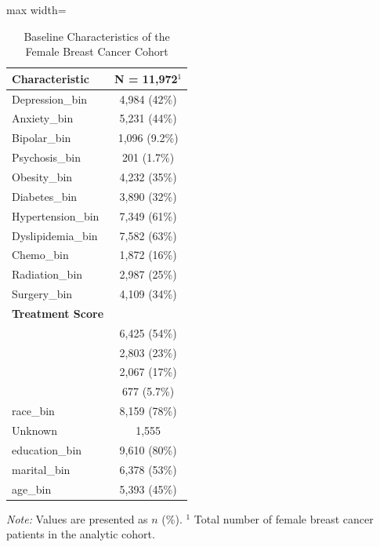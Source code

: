 \documentclass[11pt]{article}
\begin{document}
\begin{table}[H]
\centering
\caption{Baseline Characteristics of the Female Breast Cancer Cohort}
\label{tab:baseline_characteristics}
\small

\begin{adjustbox}{max width=\textwidth}
\begin{tabular}{lc}
\toprule
\textbf{Characteristic} & \textbf{N = 11,972$^{1}$} \\
\midrule

Depression\_bin & 4,984 (42\%) \\
Anxiety\_bin & 5,231 (44\%) \\
Bipolar\_bin & 1,096 (9.2\%) \\
Psychosis\_bin & 201 (1.7\%) \\

Obesity\_bin & 4,232 (35\%) \\
Diabetes\_bin & 3,890 (32\%) \\
Hypertension\_bin & 7,349 (61\%) \\
Dyslipidemia\_bin & 7,582 (63\%) \\

Chemo\_bin & 1,872 (16\%) \\
Radiation\_bin & 2,987 (25\%) \\
Surgery\_bin & 4,109 (34\%) \\

\textbf{Treatment Score} & \\
\quad 0 & 6,425 (54\%) \\
\quad 1 & 2,803 (23\%) \\
\quad 2 & 2,067 (17\%) \\
\quad 3 & 677 (5.7\%) \\

race\_bin & 8,159 (78\%) \\
\quad Unknown & 1,555 \\

education\_bin & 9,610 (80\%) \\
marital\_bin & 6,378 (53\%) \\
age\_bin & 5,393 (45\%) \\

\bottomrule
\end{tabular}
\end{adjustbox}

\vspace{2mm}

\begin{flushleft}
\footnotesize
\textit{Note:} Values are presented as $n$ (\%). 
$^{1}$ Total number of female breast cancer patients in the analytic cohort.
\end{flushleft}

\end{table}
\end{document}
